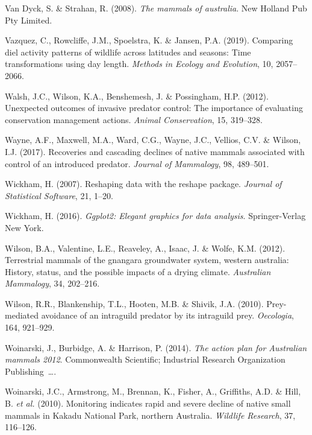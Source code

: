 \documentclass[11pt,a4paper,titlepage,twoside,openright]{style/unimelbthesis}
\begin{document}
\begin{mainmatter}
\leavevmode\hypertarget{ref-van2008mammals}{}%
Van Dyck, S. \& Strahan, R. (2008). \emph{The mammals of australia}. New Holland Pub Pty Limited.

\leavevmode\hypertarget{ref-vazquez2019comparing}{}%
Vazquez, C., Rowcliffe, J.M., Spoelstra, K. \& Jansen, P.A. (2019). Comparing diel activity patterns of wildlife across latitudes and seasons: Time transformations using day length. \emph{Methods in Ecology and Evolution}, 10, 2057--2066.

\leavevmode\hypertarget{ref-walsh2012unexpected}{}%
Walsh, J.C., Wilson, K.A., Benshemesh, J. \& Possingham, H.P. (2012). Unexpected outcomes of invasive predator control: The importance of evaluating conservation management actions. \emph{Animal Conservation}, 15, 319--328.

\leavevmode\hypertarget{ref-wayne2017recoveries}{}%
Wayne, A.F., Maxwell, M.A., Ward, C.G., Wayne, J.C., Vellios, C.V. \& Wilson, I.J. (2017). Recoveries and cascading declines of native mammals associated with control of an introduced predator. \emph{Journal of Mammalogy}, 98, 489--501.

\leavevmode\hypertarget{ref-reshape}{}%
Wickham, H. (2007). Reshaping data with the reshape package. \emph{Journal of Statistical Software}, 21, 1--20.

\leavevmode\hypertarget{ref-ggplot2}{}%
Wickham, H. (2016). \emph{Ggplot2: Elegant graphics for data analysis}. Springer-Verlag New York.

\leavevmode\hypertarget{ref-wilson2012terrestrial}{}%
Wilson, B.A., Valentine, L.E., Reaveley, A., Isaac, J. \& Wolfe, K.M. (2012). Terrestrial mammals of the gnangara groundwater system, western australia: History, status, and the possible impacts of a drying climate. \emph{Australian Mammalogy}, 34, 202--216.

\leavevmode\hypertarget{ref-wilson2010prey}{}%
Wilson, R.R., Blankenship, T.L., Hooten, M.B. \& Shivik, J.A. (2010). Prey-mediated avoidance of an intraguild predator by its intraguild prey. \emph{Oecologia}, 164, 921--929.

\leavevmode\hypertarget{ref-woinarski2014action}{}%
Woinarski, J., Burbidge, A. \& Harrison, P. (2014). \emph{The action plan for Australian mammals 2012}. Commonwealth Scientific; Industrial Research Organization Publishing~\ldots.

\leavevmode\hypertarget{ref-woinarski2010monitoring}{}%
Woinarski, J.C., Armstrong, M., Brennan, K., Fisher, A., Griffiths, A.D. \& Hill, B. \emph{et al.} (2010). Monitoring indicates rapid and severe decline of native small mammals in Kakadu National Park, northern Australia. \emph{Wildlife Research}, 37, 116--126.


\end{mainmatter}
\end{document}
